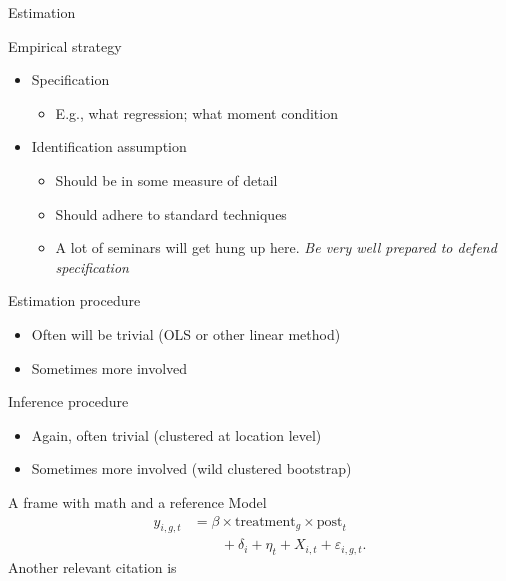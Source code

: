 \documentclass[aspectratio=169, 11pt]{beamer}
\begin{document}
\begin{frame}{Estimation}

    \small
    Empirical strategy\\
    \begin{itemize}
        \item Specification
        \begin{itemize}
            \item E.g., what regression; what moment condition
        \end{itemize}
        \item Identification assumption
        \begin{itemize}
            \item Should be in some measure of detail
            \item Should adhere to standard techniques
            \item A lot of seminars will get hung up here. \emph{Be very well prepared to defend specification}
        \end{itemize}
    \end{itemize}
    
    Estimation procedure\\
    \begin{itemize}
        \item Often will be trivial (OLS or other linear method)
        \item Sometimes more involved
    \end{itemize}
    
    Inference procedure\\
    \begin{itemize}
        \item Again, often trivial (clustered at location level)
        \item Sometimes more involved (wild clustered bootstrap)
    \end{itemize}
\end{frame}

\begin{frame}{A frame with math and a reference}
    Model \parencite{article1}
    \begin{equation}
    \begin{aligned}
        y_{i,g,t} &= \beta \times \text{treatment}_g \times \text{post}_t \\
        &\qquad + \delta_i + \eta_t + X_{i,t} + \varepsilon_{i,g,t}.
    \end{aligned}
    \end{equation}
    Another relevant citation is \cite{article2}
\end{frame}
\end{document}

